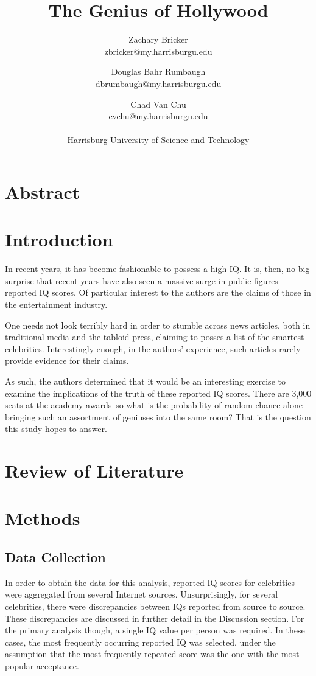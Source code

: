 \documentclass[12pt,letterpaper,titlepage,oneside]{article}
\title{The Genius of Hollywood}
\author{
	Zachary Bricker  \\
	zbricker@my.harrisburgu.edu
	\and
	Douglas Bahr Rumbaugh \\
	dbrumbaugh@my.harrisburgu.edu
	\and 
	Chad Van Chu \\
	cvchu@my.harrisburgu.edu
	\\
	\\
	Harrisburg University of Science and Technology
}
\date{}
\begin{document}
\maketitle
\section*{Abstract}
\tableofcontents
\pagebreak


\section{Introduction}
In recent years, it has become fashionable to possess a high IQ. It is, then, no big surprise that recent years have also seen a massive surge in public figures reported IQ scores. Of particular interest to the authors are the claims of those in the entertainment industry.

One needs not look terribly hard in order to stumble across news articles, both in traditional media and the tabloid press, claiming to posses a list of the smartest celebrities. Interestingly enough, in the authors' experience, such articles rarely provide evidence for their claims.

As such, the authors determined that it would be an interesting exercise to examine the implications of the truth of these reported IQ scores. There are 3,000 seats at the academy awards--so what is the probability of random chance alone bringing such an assortment of geniuses into the same room? That is the question this study hopes to answer.
\section{Review of Literature}

\section{Methods}

\subsection{Data Collection}
In order to obtain the data for this analysis, reported IQ scores for celebrities were aggregated from several Internet sources. Unsurprisingly, for several celebrities, there were discrepancies between IQs reported from source to source. These discrepancies are discussed in further detail in the Discussion section. For the primary analysis though, a single IQ value per person was required. In these cases, the most frequently occurring reported IQ was selected, under the assumption that the most frequently repeated score was the one with the most popular acceptance.
\end{document}
